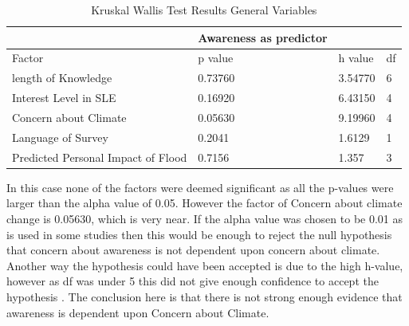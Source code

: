 \begin{table}[h!]
    \centering
    \begin{tabular}{|l|l|l|l|}
    \hline
         ~ &Awareness as predictor & ~ & ~ \\ \hline
        Factor & p value & h value & df \\ \hline
           length of Knowledge & 0.73760 & 3.54770 & 6 \\ \hline
       Interest Level in SLE & 0.16920 & 6.43150 & 4 \\ \hline
        Concern about Climate & \cellcolor[HTML]{7df9ff} 0.05630 & 9.19960 & 4 \\ \hline
        Language of Survey & 0.2041 & 1.6129 & 1 \\ \hline
        Predicted Personal Impact of Flood & 0.7156 & 1.357 & 3 \\ \hline
    \end{tabular}
    \caption{Kruskal Wallis Test Results General Variables}
    \label{Kruskal_wallis_test_general}
\end{table}

In this case none of the factors were deemed significant as all the p-values were larger than the alpha value of 0.05. However the factor of Concern about climate change is 0.05630, which is very near. If the alpha value was chosen to be 0.01 as is used in some studies \cite{hollander_nonparametric_2014} then this would be enough to reject the null hypothesis that concern about awareness is not dependent upon concern about climate. Another way the hypothesis could have been accepted is due to the high h-value, however as df was under 5 this did not give enough confidence to accept the hypothesis \cite{minitab_interpret_2022}. The conclusion here is that there is not strong enough evidence that awareness is dependent upon Concern about Climate.




